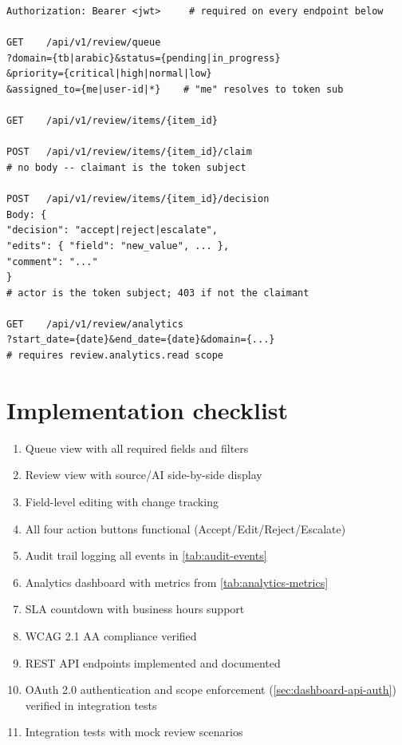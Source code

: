 \documentclass[11pt,a4paper,twoside]{report}
\begin{document}
\begin{lstlisting}[basicstyle=\ttfamily\small,caption={Review dashboard API endpoints (auth header required on all).}]
Authorization: Bearer <jwt>     # required on every endpoint below

GET    /api/v1/review/queue
?domain={tb|arabic}&status={pending|in_progress}
&priority={critical|high|normal|low}
&assigned_to={me|user-id|*}    # "me" resolves to token sub

GET    /api/v1/review/items/{item_id}

POST   /api/v1/review/items/{item_id}/claim
# no body -- claimant is the token subject

POST   /api/v1/review/items/{item_id}/decision
Body: {
"decision": "accept|reject|escalate",
"edits": { "field": "new_value", ... },
"comment": "..."
}
# actor is the token subject; 403 if not the claimant

GET    /api/v1/review/analytics
?start_date={date}&end_date={date}&domain={...}
# requires review.analytics.read scope
\end{lstlisting}

\section{Implementation checklist}

\begin{enumerate}
\item[$\square$] Queue view with all required fields and filters
\item[$\square$] Review view with source/AI side-by-side display
\item[$\square$] Field-level editing with change tracking
\item[$\square$] All four action buttons functional (Accept/Edit/Reject/Escalate)
\item[$\square$] Audit trail logging all events in \cref{tab:audit-events}
\item[$\square$] Analytics dashboard with metrics from \cref{tab:analytics-metrics}
\item[$\square$] SLA countdown with business hours support
\item[$\square$] WCAG 2.1 AA compliance verified
\item[$\square$] REST API endpoints implemented and documented
\item[$\square$] OAuth 2.0 authentication and scope enforcement
(\cref{sec:dashboard-api-auth}) verified in integration tests
\item[$\square$] Integration tests with mock review scenarios
\end{enumerate}
\end{document}
